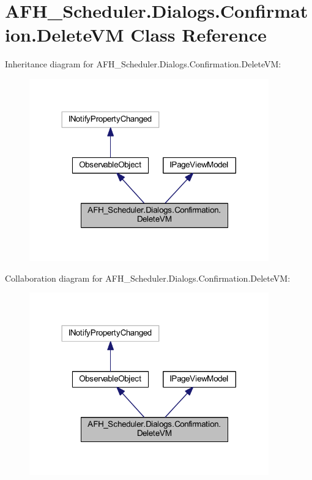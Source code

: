 \section{A\+F\+H\+\_\+\+Scheduler.\+Dialogs.\+Confirmation.\+Delete\+VM Class Reference}
\label{class_a_f_h___scheduler_1_1_dialogs_1_1_confirmation_1_1_delete_v_m}


Inheritance diagram for A\+F\+H\+\_\+\+Scheduler.\+Dialogs.\+Confirmation.\+Delete\+VM\+:
\nopagebreak
\begin{figure}[H]
\begin{center}
\leavevmode
\includegraphics[width=293pt]{class_a_f_h___scheduler_1_1_dialogs_1_1_confirmation_1_1_delete_v_m__inherit__graph}
\end{center}
\end{figure}


Collaboration diagram for A\+F\+H\+\_\+\+Scheduler.\+Dialogs.\+Confirmation.\+Delete\+VM\+:
\nopagebreak
\begin{figure}[H]
\begin{center}
\leavevmode
\includegraphics[width=293pt]{class_a_f_h___scheduler_1_1_dialogs_1_1_confirmation_1_1_delete_v_m__coll__graph}
\end{center}
\end{figure}
